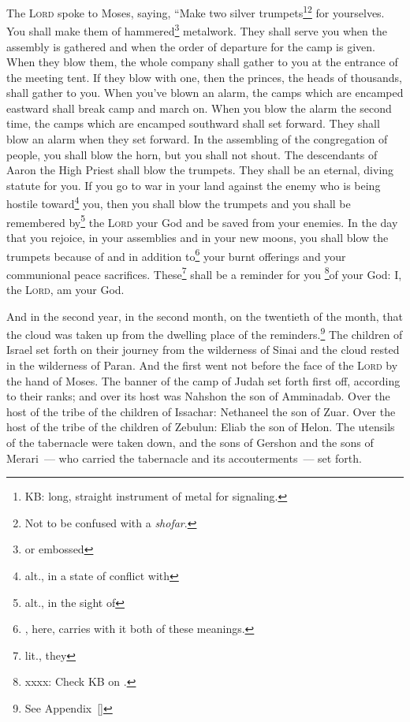 
\begin{inparaenum}
     The \textsc{Lord} spoke to Moses, saying,%
     ``Make two silver trumpets\footnote{KB: long, straight instrument of metal for signaling.}\footnote{Not to be confused with a \textit{shofar}.} for yourselves. You shall make them of hammered\footnote{or embossed} metalwork. They shall serve you when the assembly is gathered and when the order of departure for the camp is given.%
     When they blow them, the whole company shall gather to you at the entrance of the meeting tent.%
     If they blow with one, then the princes, the heads of thousands, shall gather to you.%
     When you've blown an alarm, the camps which are encamped eastward shall break camp and march on.%
     When you blow the alarm the second time, the camps which are encamped southward shall set forward. They shall blow an alarm when they set forward.%
     In the assembling of the congregation of people, you shall blow the horn, but you shall not shout.%
     The descendants of Aaron the High Priest shall blow the trumpets. They shall be an eternal, diving statute for you.%
     If you go to war in your land against the enemy who is being hostile toward\footnote{alt., in a state of conflict with} you, then you shall blow the trumpets and you shall be remembered by\footnote{alt., in the sight of} the \textsc{Lord} your God and be saved from your enemies.%
     In the day that you rejoice, in your assemblies and in your new moons, you shall blow the trumpets because of and in addition to\footnote{, here, carries with it both of these meanings.} your burnt offerings and your communional peace sacrifices. These\footnote{lit., they} shall be a reminder for you \footnote{xxxx: Check KB on .}of your God: I, the \textsc{Lord}, am your God.%
    
     And in the second year, in the second month, on the twentieth of the month, that the cloud was taken up from the dwelling place of the reminders.\footnote{See Appendix~\ref{}}%
     The children of Israel set forth on their journey from the wilderness of Sinai and the cloud rested in the wilderness of Paran.%
     And the first went not before the face of the \textsc{Lord} by the hand of Moses.%
     The banner of the camp of Judah set forth first off, according to their ranks; and over its host was Nahshon the son of Amminadab.%
     Over the host of the tribe of the children of Issachar: Nethaneel the son of Zuar.%
     Over the host of the tribe of the children of Zebulun: Eliab the son of Helon.%
     The utensils of the tabernacle were taken down, and the sons of Gershon and the sons of Merari~--- who carried the tabernacle and its accouterments~--- set forth.%
    

\end{inparaenum}
